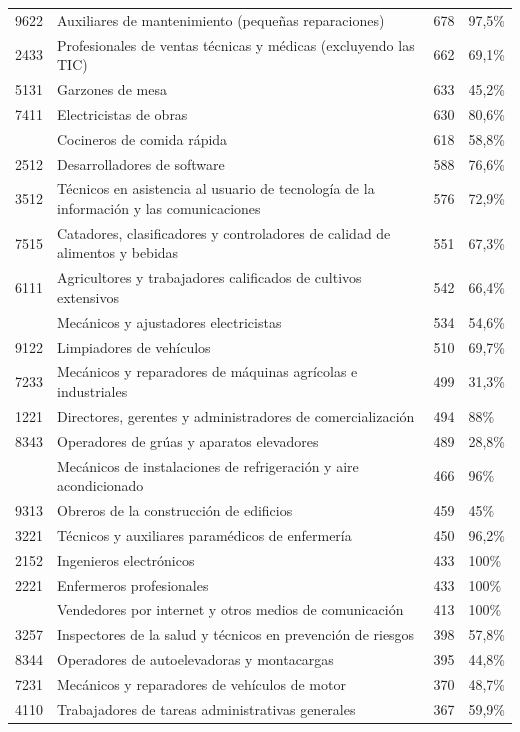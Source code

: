 \documentclass[
  11pt,
]{article}
\begin{document}
\begin{longtable}{r>{\raggedright\arraybackslash}p{9cm}rl}
9622 & Auxiliares de mantenimiento (pequeñas reparaciones) & 678 & 97,5\%\\
2433 & Profesionales de ventas técnicas y médicas (excluyendo las TIC) & 662 & 69,1\%\\
5131 & Garzones de mesa & 633 & 45,2\%\\
7411 & Electricistas de obras & 630 & 80,6\%\\
\addlinespace
9411 & Cocineros de comida rápida & 618 & 58,8\%\\
2512 & Desarrolladores de software & 588 & 76,6\%\\
3512 & Técnicos en asistencia al usuario de tecnología de la información y las comunicaciones & 576 & 72,9\%\\
7515 & Catadores, clasificadores y controladores de calidad de alimentos y bebidas & 551 & 67,3\%\\
6111 & Agricultores y trabajadores calificados de cultivos extensivos & 542 & 66,4\%\\
\addlinespace
7412 & Mecánicos y ajustadores electricistas & 534 & 54,6\%\\
9122 & Limpiadores de vehículos & 510 & 69,7\%\\
7233 & Mecánicos y reparadores de máquinas agrícolas e industriales & 499 & 31,3\%\\
1221 & Directores, gerentes y administradores de comercialización & 494 & 88\%\\
8343 & Operadores de grúas y aparatos elevadores & 489 & 28,8\%\\
\addlinespace
7127 & Mecánicos de instalaciones de refrigeración y aire acondicionado & 466 & 96\%\\
9313 & Obreros de la construcción de edificios & 459 & 45\%\\
3221 & Técnicos y auxiliares paramédicos de enfermería & 450 & 96,2\%\\
2152 & Ingenieros electrónicos & 433 & 100\%\\
2221 & Enfermeros profesionales & 433 & 100\%\\
\addlinespace
5244 & Vendedores por internet y otros medios de comunicación & 413 & 100\%\\
3257 & Inspectores de la salud y técnicos en prevención de riesgos & 398 & 57,8\%\\
8344 & Operadores de autoelevadoras y montacargas & 395 & 44,8\%\\
7231 & Mecánicos y reparadores de vehículos de motor & 370 & 48,7\%\\
4110 & Trabajadores de tareas administrativas generales & 367 & 59,9\%\\

\end{longtable}
\end{document}
